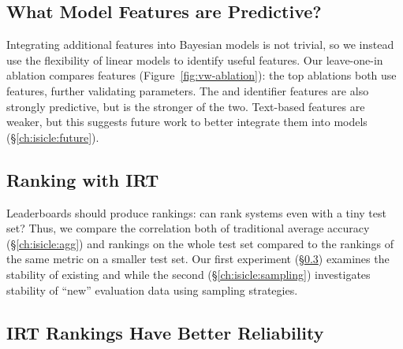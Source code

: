 \begin{figure*}[th]
    \centering
    \caption{
        We compare each \irt{} and linear model () by how well they predict \subj{} \resps{}.
        We focus on  since predicting responses is an imbalanced classification problem (most \subjs{} are correct).
        Under that metric, all \irt{} models improve over the best
        , and the strongest  ablation only uses \irt{} features.
        That textual features are predictive in the  suggests they could improve future models.
    }
    \label{fig:vw-ablation}
\end{figure*}


\subsection{What Model Features are Predictive?}

Integrating additional features into Bayesian models is not trivial,
so we instead use the flexibility of linear models to identify useful
features.
Our leave-one-in ablation compares features (Figure~\ref{fig:vw-ablation}):
the top ablations both use \irt{} features, further validating
\irt{} parameters.
The \subj{} and \itm{} identifier features are also
strongly predictive, but \itm{} is the stronger of the two.
Text-based features are weaker, but this suggests future work to
better integrate them into \irt{} models (\S\ref{ch:isicle:future}).



\subsection{Ranking with IRT}

Leaderboards should produce  \subj{} rankings: can
\name{} rank systems even with a tiny test set?
Thus, we compare the correlation both of traditional average accuracy
(\S\ref{ch:isicle:agg}) and \irt{} rankings on the whole test
set compared to the rankings of the same metric on a smaller test set.
Our first experiment (\S\ref{ch:isicle:stable}) examines the stability
of existing \itms{} and \subjs{} while the second
(\S\ref{ch:isicle:sampling}) investigates stability of ``new''
evaluation data using sampling strategies.

\subsection{IRT Rankings Have Better Reliability}
\label{ch:isicle:stable}

